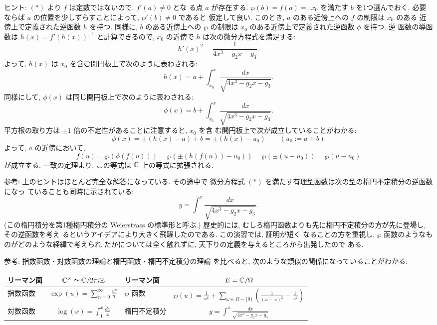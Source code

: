 \documentclass[12pt,twoside]{jarticle}
\def\setminus{-}
\def\pe{\wp}
\def\Z{{\Bbb Z}} %
\def\C{{\Bbb C}} %
\begin{document}
\noindent ヒント: $(*)$ より $f$ は定数ではないので, $f'(a)\ne0$ とな
る点 $a$ が存在する. $\pe(b)=f(a)=:x_0$ を満たす $b$ を1つ選んでおく. 
必要ならば $a$ の位置を少しずらすことによって, $\pe'(b)\ne0$ であると
仮定して良い. このとき, $a$ のある近傍上への $f$ の制限は $x_0$ のある
近傍上で定義された逆函数 $h$ を持つ. 同様に, $b$ のある近傍上への %
$\pe$ の制限は $x_0$ のある近傍上で定義された逆函数 $\phi$ を持つ. 逆
函数の導函数は $h(x)=f'(h(x))^{-1}$ と計算できるので, $x_0$ の近傍で %
$h$ は次の微分方程式を満足する:
\[
  h'(x)^2 = \frac{1}{4x^3 - g_2 x -g_3}.
\]
よって, $h(x)$ は $x_0$ を含む開円板上で次のように表わされる:
\[
  h(x) = a + \int_{x_0}^x \frac{dx}{\sqrt{4x^3 - g_2 x - g_3}}.
\]
同様にして, $\phi(x)$ は同じ開円板上で次のように表わされる:
\[
  \phi(x) = b + \int_{x_0}^x \frac{dx}{\sqrt{4x^3 - g_2 x - g_3}}.
\]
平方根の取り方は $\pm 1$ 倍の不定性があることに注意すると, $x_0$ を含
む開円板上で次が成立していることがわかる:
\[
  \phi(x) = \pm(h(x)-a)+b = \pm (h(x) - u_0)
  \qquad
  (u_0:= a \mp b)
\]
よって, $a$ の近傍において,
\[
  f(u) = \pe(\phi(f(u))) 
  = \pe(\pm (h(f(u)) - u_0))
  = \pe(\pm (u - u_0))
  = \pe(u - u_0)
\]
が成立する. 一致の定理より, この等式は $\C$ 上の等式に拡張される.

\medskip

\noindent 参考: 上のヒントはほとんど完全な解答になっている. その途中で
微分方程式 $(*)$ を満たす有理型函数は次の型の楕円不定積分の逆函数になっ
ていることも同時に示されている:
\[
  y = \int^x \frac{dx}{\sqrt{4x^3 - g_2 x - g_3}}.
\] %
(この楕円積分を第1種楕円積分の Weierstrass の標準形と呼ぶ.) 歴史的には,
むしろ楕円函数よりも先に楕円不定積分の方が先に登場し, その逆函数を考え
るというアイデアにより大きく飛躍したのである. この演習では, 証明が短く
なることの方を重視し, $\pe$ 函数のようなものがどのような経緯で考えられ
たかについては全く触れずに, 天下りの定義を与えるところから出発したので
ある. 

\medskip

\noindent 参考: 指数函数・対数函数の理論と楕円函数・楕円不定積分の理論
を比べると, 次のような類似の関係になっていることがわかる:
\begin{center}
\begin{tabular}{lc|lc}
  リーマン面 &
  $\C^{\times}\simeq \C/2\pi i\Z$
  &
  リーマン面 &
  $E = \C/\Omega$
  \\ \hline
  指数函数 &
  $\displaystyle \exp(u) = \sum_{n=0}^\infty \frac{u^n}{n!}$
  &
  $\pe$ 函数 & 
  $\displaystyle 
  \pe(u) = \frac{1}{u^2} 
  + \sum_{\omega\in\Omega\setminus\{0\}} 
  \left(\frac{1}{(u-\omega)^2} - \frac{1}{\omega^2}\right)$
  \\ \hline
  対数函数 &
  $\displaystyle \log(x) = \int_1^x \frac{dx}{x}$
  &
  楕円不定積分 &
  $\displaystyle y = \int^x \frac{dx}{\sqrt{4x^3 - g_2 x - g_3}}$
\end{tabular}
\end{center}
\end{document}
